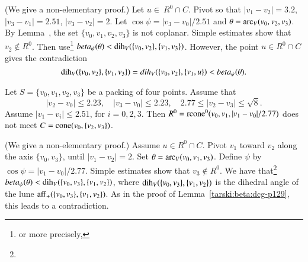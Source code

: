 \begin{tarskidata}
\begin{tarski}
\begin{proved} (We give a non-elementary proof.)  Let $u\in\ R^0\cap C$.
Pivot so that $|v_1-v_2|=3.2$, $|v_3-v_1|=2.51$, $|v_3-v_2|=2$.
Let $\cos\psi  =|v_3-v_0|/2.51$ and $\theta=\operatorname{arc}_V(v_0,v_2,v_3)$. 
By Lemma~, the
set $\{v_0,v_1,v_2,v_3\}$ is not coplanar. 
Simple estimates show that $v_2\not\in R^0$.
Then use\footnote{ or more precisely,  } %
 $beta_\psi(\theta) < \operatorname{dih}_V(\{v_0,v_2\},\{v_1,v_3\})$.
However, the point $u\in R^0\cap C$ gives the contradiction
$$
  \operatorname{dih}_V(\{v_0,v_2\},\{v_1,v_3\}) = dih_V(\{v_0,v_2\},\{v_1,u\}) < beta_\psi(\theta).
$$
\swallowed\end{proved}
\end{tarski}






\begin{tarski}

\begin{lemma}
Let $S=\{v_0,v_1,v_2,v_3\}$ be a packing of four points.
Assume that
   $$
   |v_2-v_0|\le 2.23,\quad |v_3-v_0|\le 2.23,\quad 2.77\le |v_2-v_3|\le\sqrt8.
   $$
Assume $|v_1-v_i|\le 2.51$, for $i=0,2,3$.
Then $R^0={\operatorname{rcone}}^0(v_0,v_1,|v_1-v_0|/2.77)$ does not meet
$C={\operatorname{cone}}(v_0,\{v_2,v_3\})$.
\end{lemma}


\begin{proved} (We give a non-elementary proof.)  Assume $u\in R^0\cap C$.
Pivot $v_1$ toward $v_2$
along the axis $\{v_0,v_3\}$, until $|v_1-v_2|=2$.
Set $\theta = \operatorname{arc}_V(v_0,v_1,v_3)$.
Define $\psi$ by $\cos\psi = |v_1-v_0|/2.77$.
Simple estimates show that $v_3\not\in R^0$.
We have that\footnote{}
    $beta_\psi(\theta) < \operatorname{dih}_V(\{v_0,v_3\},\{v_1,v_2\})$,
where $\operatorname{dih}_V(\{v_0,v_3\},\{v_1,v_2\})$ is the dihedral angle 
of the lune ${\operatorname{aff}}_+(\{v_0,v_3\},\{v_1,v_2\})$. 
As in the proof of Lemma~\ref{tarski:beta:dcg-p129}, this leads to a contradiction.
\swallowed\end{proved}
\end{tarski}





\end{tarskidata}
